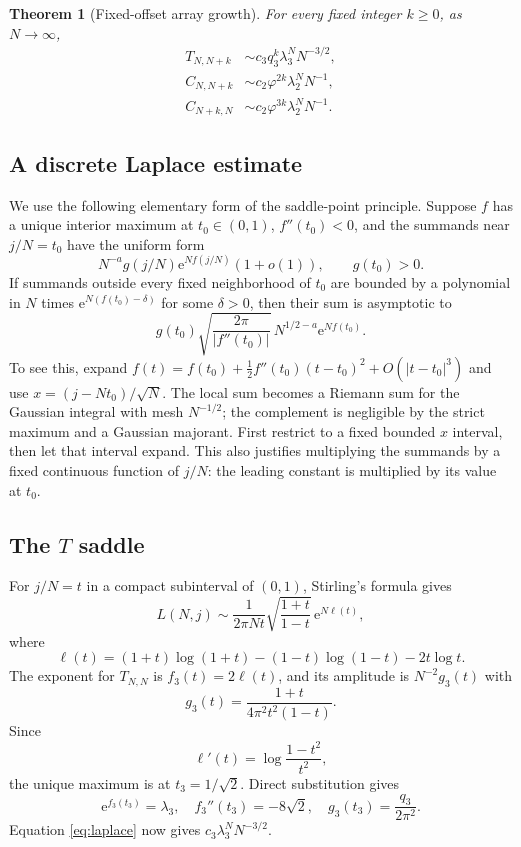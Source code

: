 \documentclass[11pt,letterpaper]{article}
\numberwithin{equation}{section}
\newtheorem{theorem}{Theorem}[section]
\theoremstyle{definition}
\newcommand{\ee}{\mathrm e}
\begin{document}
\begin{theorem}[Fixed-offset array growth]\label{thm:arrayasymp}
For every fixed integer $k\geq0$, as $N\to\infty$,
\begin{align}
 T_{N,N+k}&\sim c_3q_3^k\lambda_3^N N^{-3/2},\label{eq:Tasymp}\\
 C_{N,N+k}&\sim c_2\varphi^{2k}\lambda_2^N N^{-1},\label{eq:Casympupper}\\
 C_{N+k,N}&\sim c_2\varphi^{3k}\lambda_2^N N^{-1}.\label{eq:Casymplower}
\end{align}
\end{theorem}

\subsection{A discrete Laplace estimate}

We use the following elementary form of the saddle-point principle.
Suppose $f$ has a unique interior maximum at $t_0\in(0,1)$,
$f''(t_0)<0$, and the summands near $j/N=t_0$ have the uniform form
\[
 N^{-a}g(j/N)\ee^{Nf(j/N)}(1+o(1)),\qquad g(t_0)>0.
\]
If summands outside every fixed neighborhood of $t_0$ are bounded by a
polynomial in $N$ times $\ee^{N(f(t_0)-\delta)}$ for some $\delta>0$,
then their sum is asymptotic to
\begin{equation}\label{eq:laplace}
 g(t_0)\sqrt{\frac{2\pi}{|f''(t_0)|}}\,
 N^{1/2-a}\ee^{Nf(t_0)}.
\end{equation}
To see this, expand
$f(t)=f(t_0)+\tfrac12f''(t_0)(t-t_0)^2+O(|t-t_0|^3)$ and use
$x=(j-Nt_0)/\sqrt N$. The local sum becomes a Riemann sum for the
Gaussian integral with mesh $N^{-1/2}$; the complement is negligible
by the strict maximum and a Gaussian majorant. First restrict to a
fixed bounded $x$ interval, then let that interval expand. This also
justifies multiplying the summands by a fixed continuous function of
$j/N$: the leading constant is multiplied by its value at $t_0$.

\subsection{The \texorpdfstring{$T$}{T} saddle}

For $j/N=t$ in a compact subinterval of $(0,1)$, Stirling's formula gives
\begin{equation}\label{eq:Lstirling}
 L(N,j)\sim\frac1{2\pi Nt}
 \sqrt{\frac{1+t}{1-t}}\,\ee^{N\ell(t)},
\end{equation}
where
\[
 \ell(t)=(1+t)\log(1+t)-(1-t)\log(1-t)-2t\log t.
\]
The exponent for $T_{N,N}$ is $f_3(t)=2\ell(t)$, and its amplitude
is $N^{-2}g_3(t)$ with
\[
 g_3(t)=\frac{1+t}{4\pi^2t^2(1-t)}.
\]
Since
\[
 \ell'(t)=\log\frac{1-t^2}{t^2},
\]
the unique maximum is at $t_3=1/\sqrt2$. Direct substitution gives
\[
 \ee^{f_3(t_3)}=\lambda_3,\quad
 f_3''(t_3)=-8\sqrt2,\quad
 g_3(t_3)=\frac{q_3}{2\pi^2}.
\]
Equation \eqref{eq:laplace} now gives $c_3\lambda_3^N N^{-3/2}$.
\end{document}
